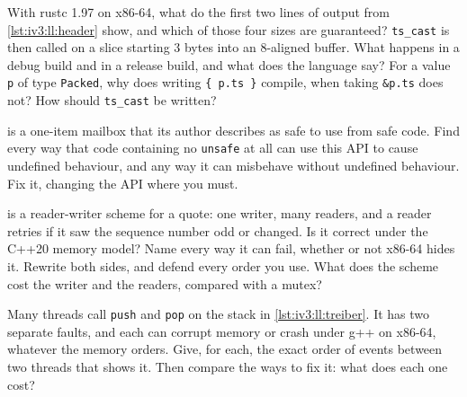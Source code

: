 \begin{question}\label{iq:iv3:low-latency:29}
With rustc 1.97 on x86-64, what do the first two lines of output from \cref{lst:iv3:ll:header} show, and which of those four sizes are guaranteed? \texttt{ts\_cast} is then called on a slice starting 3 bytes into an 8-aligned buffer. What happens in a debug build and in a release build, and what does the language say? For a value \texttt{p} of type \texttt{Packed}, why does writing \texttt{\{ p.ts \}} compile, when taking \texttt{\&p.ts} does not? How should \texttt{ts\_cast} be written?
\label{lst:iv3:ll:header}
\end{question}

\begin{question}\label{iq:iv3:low-latency:30}
 is a one-item mailbox that its author describes as safe to use from safe code. Find every way that code containing no \texttt{unsafe} at all can use this API to cause undefined behaviour, and any way it can misbehave without undefined behaviour. Fix it, changing the API where you must.
\label{lst:iv3:ll:mailbox}
\end{question}

\begin{question}\label{iq:iv3:low-latency:31}
 is a reader-writer scheme for a quote: one writer, many readers, and a reader retries if it saw the sequence number odd or changed. Is it correct under the C++20 memory model? Name every way it can fail, whether or not x86-64 hides it. Rewrite both sides, and defend every order you use. What does the scheme cost the writer and the readers, compared with a mutex?
\label{lst:iv3:ll:seqlock}
\end{question}

\begin{question}\label{iq:iv3:low-latency:32}
Many threads call \texttt{push} and \texttt{pop} on the stack in \cref{lst:iv3:ll:treiber}. It has two separate faults, and each can corrupt memory or crash under g++ on x86-64, whatever the memory orders. Give, for each, the exact order of events between two threads that shows it. Then compare the ways to fix it: what does each one cost?
\label{lst:iv3:ll:treiber}
\end{question}

